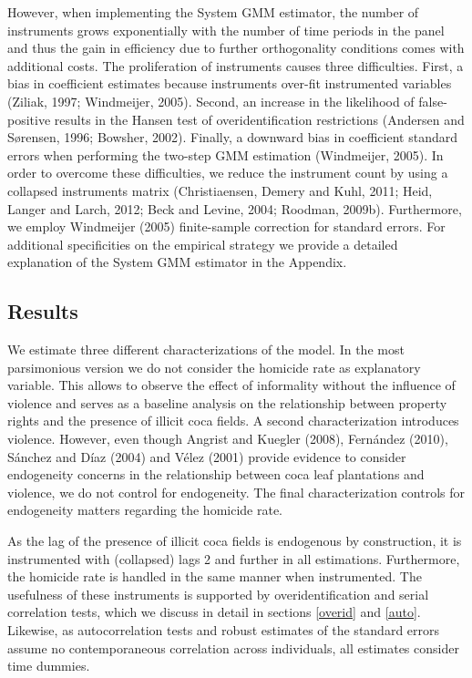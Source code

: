\documentclass[12pt,a4paper,english]{article}%
\begin{document}
However, when implementing the System GMM estimator, the number of instruments grows exponentially with the number of time periods in the panel and thus the gain in efficiency due to further orthogonality conditions comes with additional costs. The proliferation of instruments causes three difficulties. First, a bias in coefficient estimates because instruments over-fit instrumented variables (Ziliak, 1997; Windmeijer, 2005). Second, an increase in the likelihood of false-positive results in the Hansen test of overidentification restrictions (Andersen and S\o rensen,  1996; Bowsher, 2002). Finally, a downward bias in coefficient standard errors when performing the two-step GMM estimation (Windmeijer, 2005). In order to overcome these difficulties, we reduce the instrument count by using a collapsed instruments matrix (Christiaensen, Demery and Kuhl, 2011; Heid, Langer and Larch, 2012; Beck and Levine, 2004; Roodman, 2009b). Furthermore, we employ Windmeijer (2005) finite-sample correction for standard errors. For additional specificities on the empirical strategy we provide a detailed explanation of the System GMM estimator in the Appendix.

\subsection{Results}
\label{results}

We estimate three different characterizations of the model. In the most parsimonious version we do not consider the homicide rate as explanatory variable. This allows to observe the effect of informality without the influence of violence and serves as a baseline analysis on the relationship between property rights and the presence of illicit coca fields. A second characterization introduces violence. However, even though Angrist and Kuegler (2008), Fern\'{a}ndez (2010), S\'{a}nchez and D\'{i}az (2004) and V\'{e}lez (2001) provide evidence to consider endogeneity concerns in the relationship between coca leaf plantations and violence, we do not control for endogeneity. The final characterization controls for endogeneity matters regarding the homicide rate. 

As the lag of the presence of illicit coca fields is endogenous by construction, it is instrumented with (collapsed) lags 2 and further in all estimations. Furthermore, the homicide rate is handled in the same manner when instrumented. The usefulness of these instruments is supported by overidentification and serial correlation tests, which we discuss in detail in sections \ref{overid} and \ref{auto}. Likewise, as autocorrelation tests and robust estimates of the standard errors assume no contemporaneous correlation across individuals, all estimates consider time dummies.
\end{document}
